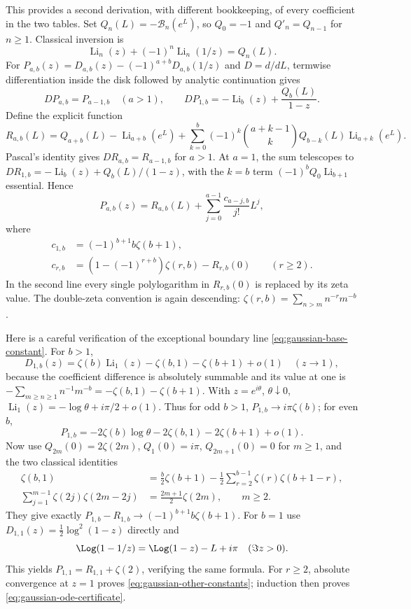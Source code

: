 This provides a second derivation, with different bookkeeping, of every
coefficient in the two tables. Set $Q_n(L)=-\mathcal B_n(e^L)$, so
$Q_0=-1$ and $Q'_n=Q_{n-1}$ for $n\ge1$. Classical inversion is
\[
 \operatorname{Li}_n(z)+(-1)^n\operatorname{Li}_n(1/z)=Q_n(L).
\]
For $P_{a,b}(z)=D_{a,b}(z)-(-1)^{a+b}D_{a,b}(1/z)$ and $D=d/dL$,
termwise differentiation inside the disk followed by analytic continuation
gives
\[
 DP_{a,b}=P_{a-1,b}\quad(a>1),\qquad
 DP_{1,b}=-\operatorname{Li}_b(z)+\frac{Q_b(L)}{1-z}.
\]
Define the explicit function
\[
 R_{a,b}(L)=Q_{a+b}(L)-\operatorname{Li}_{a+b}(e^L)
 +\sum_{k=0}^{b}(-1)^k\binom{a+k-1}{k}
       Q_{b-k}(L)\operatorname{Li}_{a+k}(e^L).
\]
Pascal's identity gives $DR_{a,b}=R_{a-1,b}$ for $a>1$. At $a=1$,
the sum telescopes to
$DR_{1,b}=-\operatorname{Li}_b(z)+Q_b(L)/(1-z)$, with the $k=b$ term
$(-1)^bQ_0\operatorname{Li}_{b+1}$ essential. Hence
\begin{equation}\label{eq:gaussian-ode-certificate}
 P_{a,b}(z)=R_{a,b}(L)+\sum_{j=0}^{a-1}\frac{c_{a-j,b}}{j!}L^j,
\end{equation}
where
\begin{align}
 c_{1,b}&=(-1)^{b+1}b\zeta(b+1),\label{eq:gaussian-base-constant}\\
 c_{r,b}&=(1-(-1)^{r+b})\zeta(r,b)-R_{r,b}(0)\qquad(r\ge2).
 \label{eq:gaussian-other-constants}
\end{align}
In the second line every single polylogarithm in $R_{r,b}(0)$ is replaced
by its zeta value. The double-zeta convention is again descending:
$\zeta(r,b)=\sum_{n>m}n^{-r}m^{-b}$.

Here is a careful verification of the exceptional boundary line
\eqref{eq:gaussian-base-constant}. For $b>1$,
\[
 D_{1,b}(z)=\zeta(b)\operatorname{Li}_1(z)-\zeta(b,1)-\zeta(b+1)+o(1)
 \quad(z\to1),
\]
because the coefficient difference is absolutely summable and its value
at one is
$-\sum_{m\ge n\ge1}n^{-1}m^{-b}=-\zeta(b,1)-\zeta(b+1)$.
With $z=e^{i\theta}$, $\theta\downarrow0$,
$\operatorname{Li}_1(z)=-\log\theta+i\pi/2+o(1)$.
Thus for odd $b>1$, $P_{1,b}\to i\pi\zeta(b)$; for even $b$,
\[
 P_{1,b}=-2\zeta(b)\log\theta-2\zeta(b,1)-2\zeta(b+1)+o(1).
\]
Now use $Q_{2m}(0)=2\zeta(2m)$, $Q_1(0)=i\pi$,
$Q_{2m+1}(0)=0$ for $m\ge1$, and the two classical identities
\begin{align*}
 \zeta(b,1)&=\frac b2\zeta(b+1)
 -\frac12\sum_{r=2}^{b-1}\zeta(r)\zeta(b+1-r),\\
 \sum_{j=1}^{m-1}\zeta(2j)\zeta(2m-2j)&=\frac{2m+1}{2}\zeta(2m),\qquad m\ge2.
\end{align*}
They give exactly $P_{1,b}-R_{1,b}\to(-1)^{b+1}b\zeta(b+1)$.
For $b=1$ use $D_{1,1}(z)=\tfrac12\log^2(1-z)$ directly and
\[
 \Log(1-1/z)=\Log(1-z)-L+i\pi\quad(\Im z>0).
\]
This yields $P_{1,1}=R_{1,1}+\zeta(2)$, verifying the same formula.
For $r\ge2$, absolute convergence at $z=1$ proves
\eqref{eq:gaussian-other-constants}; induction then proves
\eqref{eq:gaussian-ode-certificate}.

